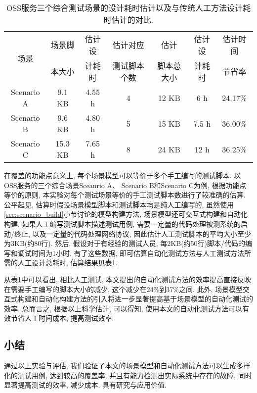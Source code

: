             \begin{table}[!htb]
                \centering
                \small
                \begin{tabular}{ccc|ccc|c}
                    \toprule
                    \multirow{2}{*}{场景} & 场景脚 & 估计设 & 估计对应     & 估计   & 估计设     & 估计时间  \\
                                          & 本大小     & 计耗时                        & 测试脚本个数 & 脚本总大小 & 计耗时 & 节省率 \\
                    \midrule
                    Scenario A & 9.1 KB & 4.55 h & 4 & 12 KB & 6 h & 24.17\% \\
                    Scenario B & 9.6 KB & 4.80 h & 5 & 15 KB & 7.5 h & 36.00\% \\
                    Scenario C & 15.3 KB & 7.65 h & 8 & 24 KB & 12 h & 36.25\% \\
                    \bottomrule
                \end{tabular}
                \caption{OSS服务三个综合测试场景的设计耗时估计以及与传统人工方法设计耗时估计的对比.}
                \label{tab:efficiency_esti}
            \end{table}
            
            在覆盖的功能点意义上, 每个场景模型可以等价于多个手工编写的测试脚本. 以OSS服务的三个综合场景Sceanrio A、 Scenario B和Scenario C为例, 根据功能点等价的原则, 本实验对每个测试场景等价的手工测试脚本数进行了较准确的估算. 公平起见, 估算时假设场景模型脚本和测试脚本均是纯人工编写的, 虽然使用\ref{sec:scenario_build}小节讨论的模型构建方法, 场景模型还可交互式构建和自动化构建. 如果人工编写测试脚本描述测试用例, 需要一定量的代码处理被测系统的启动/终止, 以及一定量的代码处理网络协议, 因此估计人工测试脚本的平均大小至少为3KB(约80行). 然后, 假设对于有经验的测试人员, 每2KB(约50行)脚本/代码的编写和调试时间为1小时. 有了这些数据, 即可估算自动化测试方法与人工测试方法所需的人工设计总耗时, 估算结果见表\ref{tab:efficiency_esti}.
            
            从表\ref{tab:efficiency_esti}中可以看出, 相比人工测试, 本文提出的自动化测试方法的效率提高直接反映在需要手工编写的脚本大小的减少, 这个减少在24\%到37\%之间. 此外, 场景模型交互式构建和自动化构建方法的引入将进一步显著提高基于场景模型的自动化测试的效率. 总而言之, 根据以上科学估计, 可以得知, 使用本文的自动化测试方法可以有效节省人工时间成本, 提高测试效率.

        \subsection{小结}
            通过以上实验与评估, 我们验证了本文的场景模型和自动化测试方法可以生成多样化的测试用例, 达到较高的覆盖率, 并且有能力检测出实际系统中存在的故障, 同时显著提高测试的效率, 减少成本. 具有研究与应用价值.
